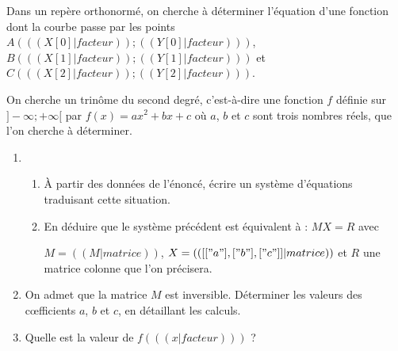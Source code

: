 Dans un repère orthonormé, on cherche à déterminer l'équation d'une fonction dont la courbe passe par les points
$A( (( X[0]|facteur )) ; (( Y[0]|facteur )) )$,
$B( (( X[1]|facteur )) ; (( Y[1]|facteur )) )$ et
$C( (( X[2]|facteur )) ; (( Y[2]|facteur )) )$.

On cherche un trinôme du second degré, c'est-à-dire une fonction $f$ définie sur $]-\infty ; +\infty[$ par $f(x) = ax^2 + bx + c$ où $a$, $b$ et $c$ sont trois nombres réels, que l'on cherche à déterminer.

  \begin{enumerate}
    \item 
      \begin{enumerate}
        \item À partir des données de l'énoncé, écrire un système d'équations traduisant cette situation.
        \item En déduire que le système précédent est équivalent à : $MX = R$ avec 

          $M = (( M|matrice ))$, $X= (( [["a"], ["b"], ["c"]]|matrice ))$ et $R$ une matrice colonne que l'on précisera.
      \end{enumerate}
  \end{enumerate}
  \begin{enumerate}
      \setcounter{enumi}{1}
    \item On admet que la matrice $M$ est inversible.
      Déterminer les valeurs des cœfficients $a$, $b$ et $c$, en détaillant les calculs.
    \item Quelle est la valeur de $f( (( x|facteur )) )$ ?

  \end{enumerate}
